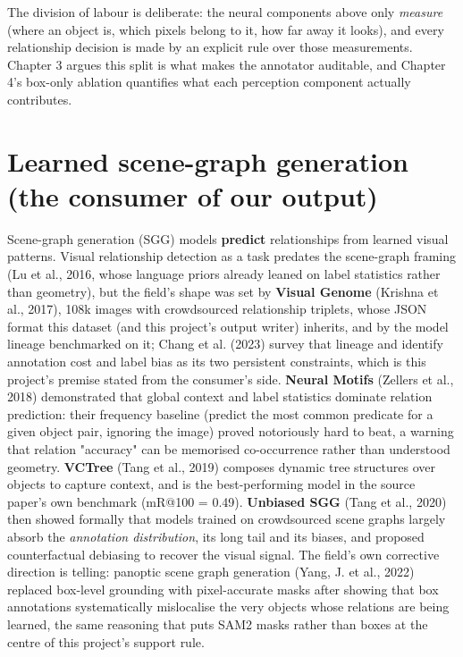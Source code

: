 The division of labour is deliberate: the neural components above only \textit{measure} (where an object is, which pixels belong to it, how far away it looks), and every relationship decision is made by an explicit rule over those measurements. Chapter 3 argues this split is what makes the annotator auditable, and Chapter 4's box-only ablation quantifies what each perception component actually contributes.

\section{Learned scene-graph generation (the consumer of our output)}

Scene-graph generation (SGG) models \textbf{predict} relationships from learned visual patterns. Visual relationship detection as a task predates the scene-graph framing (Lu et al., 2016, whose language priors already leaned on label statistics rather than geometry), but the field's shape was set by \textbf{Visual Genome} (Krishna et al., 2017), 108k images with crowdsourced relationship triplets, whose JSON format this dataset (and this project's output writer) inherits, and by the model lineage benchmarked on it; Chang et al. (2023) survey that lineage and identify annotation cost and label bias as its two persistent constraints, which is this project's premise stated from the consumer's side. \textbf{Neural Motifs} (Zellers et al., 2018) demonstrated that global context and label statistics dominate relation prediction: their frequency baseline (predict the most common predicate for a given object pair, ignoring the image) proved notoriously hard to beat, a warning that relation "accuracy" can be memorised co-occurrence rather than understood geometry. \textbf{VCTree} (Tang et al., 2019) composes dynamic tree structures over objects to capture context, and is the best-performing model in the source paper's own benchmark (mR@100 = 0.49). \textbf{Unbiased SGG} (Tang et al., 2020) then showed formally that models trained on crowdsourced scene graphs largely absorb the \textit{annotation distribution}, its long tail and its biases, and proposed counterfactual debiasing to recover the visual signal. The field's own corrective direction is telling: panoptic scene graph generation (Yang, J. et al., 2022) replaced box-level grounding with pixel-accurate masks after showing that box annotations systematically mislocalise the very objects whose relations are being learned, the same reasoning that puts SAM2 masks rather than boxes at the centre of this project's support rule.

